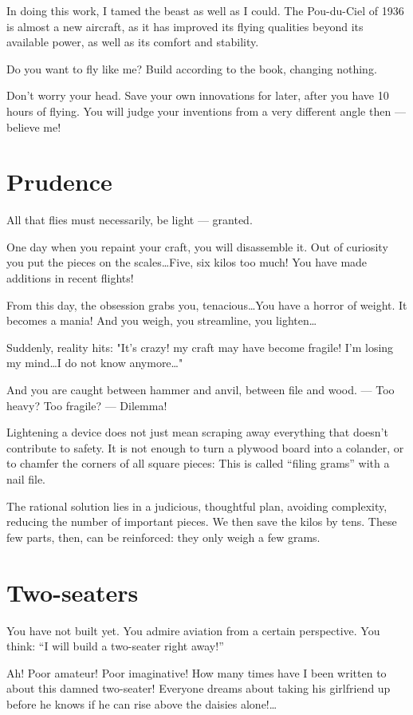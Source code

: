 \documentclass{book}
\begin{document}
In doing this work, I tamed the beast as well as I could. The
Pou-du-Ciel of 1936 is almost a new aircraft, as it has improved its
flying qualities beyond its available power, as well as its comfort
and stability.

Do you want to fly like me?  Build according to the book, changing
nothing.

Don't worry your head.  Save your own innovations for later, after you
have 10 hours of flying.  You will judge your inventions from a very
different angle then --- believe me!

\section{Prudence}

All that flies must necessarily, be light --- granted.

One day when you repaint your craft, you will disassemble it. Out of
curiosity you put the pieces on the scales\ldots Five, six kilos too
much! You have made additions in recent flights!

From this day, the obsession grabs you, tenacious\ldots You have a
horror of weight. It becomes a mania! And you weigh, you streamline,
you lighten\ldots

Suddenly, reality hits: "It's crazy! my craft may have become fragile!
I'm losing my mind\ldots I do not know anymore\ldots"

And you are caught between hammer and anvil, between file and
wood. --- Too heavy? Too fragile? --- Dilemma!

Lightening a device does not just mean scraping away everything that
doesn't contribute to safety. It is not enough to turn a plywood board
into a colander, or to chamfer the corners of all square pieces: This
is called ``filing grams'' with a nail file.

The rational solution lies in a judicious, thoughtful plan, avoiding
complexity, reducing the number of important pieces. We then save the
kilos by tens. These few parts, then, can be reinforced: they only
weigh a few grams.

\section{Two-seaters}

You have not built yet. You admire aviation from a certain perspective.
You think: ``I will build a two-seater right away!''

Ah! Poor amateur! Poor imaginative! How many times have I been written
to about this damned two-seater! Everyone dreams about taking his
girlfriend up before he knows if he can rise above the daisies
alone!\ldots{}
\end{document}
